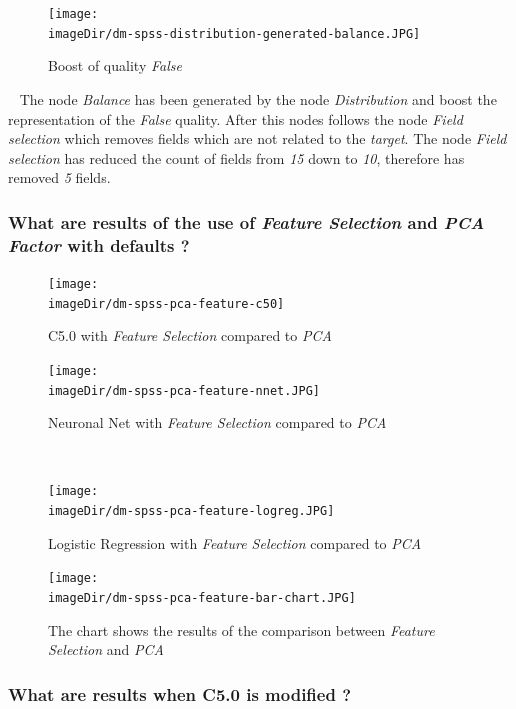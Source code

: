 \documentclass[11pt, a4paper, twoside]{article}   	%
\newcommand{\imageDir}{./images/}
\begin{document}
\begin{figure}[h]
\centering
\texttt{[image: \\imageDir/dm-spss-distribution-generated-balance.JPG]}
\caption{Boost of quality \emph{False}}
\end{figure}
\ \newline
The node \emph{Balance} has been generated by the node \emph{Distribution} and boost the representation of the \emph{False} quality. After this nodes follows the node \emph{Field selection} which removes fields which are not related to the \emph{target}. 
\newline
\newline
The node \emph{Field selection} has reduced the count of fields from \emph{15} down to \emph{10}, therefore has removed \emph{5} fields.
\newpage

\subsubsection{What are results of the use of \emph{Feature Selection} and \emph{PCA Factor} with defaults ? }
\begin{figure}[h]
\centering
\texttt{[image: \\imageDir/dm-spss-pca-feature-c50]}
\caption{C5.0 with \emph{Feature Selection} compared to \emph{PCA}}
\end{figure}

\begin{figure}[h]
\centering
\texttt{[image: \\imageDir/dm-spss-pca-feature-nnet.JPG]}
\caption{Neuronal Net with \emph{Feature Selection} compared to \emph{PCA}}
\end{figure}
\ \newpage

\begin{figure}[h]
\centering
\texttt{[image: \\imageDir/dm-spss-pca-feature-logreg.JPG]}
\caption{Logistic Regression with \emph{Feature Selection} compared to \emph{PCA}}
\end{figure}

\begin{figure}[h]
\centering
\texttt{[image: \\imageDir/dm-spss-pca-feature-bar-chart.JPG]}
\caption{The chart shows the results of the comparison between \emph{Feature Selection} and \emph{PCA} }
\end{figure}

\newpage
\subsubsection{What are results when C5.0 is modified ? }
\end{document}
